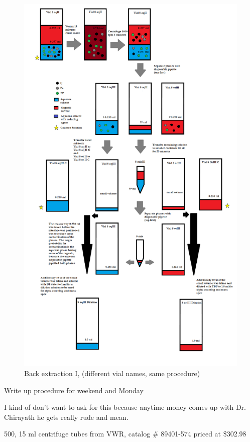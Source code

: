 \documentclass[idxtotoc,hyperref,openany,oneside]{labbook} %
\newcommand{\cmark}{\ding{51}}%
\newcommand{\done}{\rlap{$\square$}{\raisebox{2pt}{\large\hspace{1pt}\cmark}}%
  \hspace{-2.5pt}}
\begin{document}
\begin{figure}[H] %
\begin{center}
  \includegraphics[width=0.8\linewidth]
                  {Figures/Cycle_x3_round_2_extraction_3}
\end{center}
\caption{Back extraction I, (different vial names, same procedure)}
\label{fig:round2_extraction3}
\end{figure}



\begin{todolist}
\item[\done]{Write up procedure for weekend and Monday}
\end{todolist}



I kind of don't want to ask for this because anytime money comes
up with Dr. Chirayath he gets really rude and mean.
\begin{todolist}
\item{500, 15 ml centrifuge tubes from VWR, catalog \# 89401-574
  priced at \$302.98}
\end{todolist}
\end{document}
